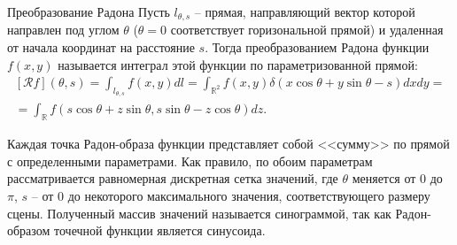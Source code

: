
\begin{definition}{Преобразование Радона}
    Пусть $l_{\theta, s}$ -- прямая, направляющий вектор которой направлен под углом $\theta$ ($\theta = 0$ соответствует горизональной прямой) и удаленная от начала координат на расстояние $s$. Тогда преобразованием Радона функции $f(x, y)$ называется интеграл этой функции по параметризованной прямой:
    \begin{gather*}
        \left[ \mathcal{R}f \right](\theta, s) =
        \int_{l_{\theta, s}} f(x, y) dl =
        \int_{\mathbb{R}^2} f(x, y) \delta(x \cos \theta + y \sin \theta - s) dx dy =\\=
        \int_{\mathbb{R}} f(s\cos\theta + z\sin\theta, s\sin\theta - z\cos\theta) dz.
    \end{gather*}
\end{definition}

Каждая точка Радон-образа функции представляет собой <<сумму>> по прямой с определенными параметрами. Как правило, по обоим параметрам рассматривается равномерная дискретная сетка значений, где $\theta$ меняется от $0$ до $\pi$, $s$ -- от $0$ до некоторого максимального значения, соответствующего размеру сцены. Полученный массив значений называется синограммой, так как Радон-образом точечной функции является синусоида.

